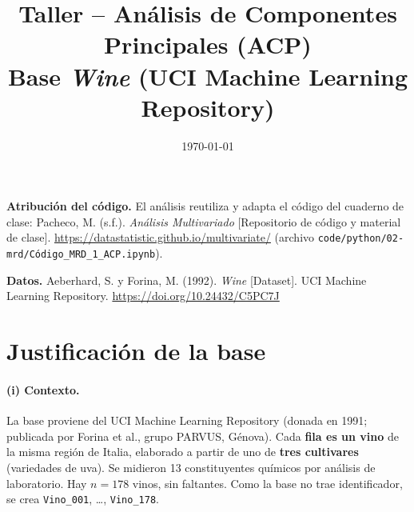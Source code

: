 \documentclass[11pt,a4paper]{article}
\title{\textbf{Taller -- Análisis de Componentes Principales (ACP)}\\[4pt]
\large Base \emph{Wine} (UCI Machine Learning Repository)}
\author{}
\date{\today}
\newcommand{\var}[1]{\texttt{#1}}
\begin{document}
\maketitle

\noindent\textbf{Atribución del código.} El análisis reutiliza y adapta el código del cuaderno de clase:
Pacheco, M. (s.f.). \emph{Análisis Multivariado} [Repositorio de código y material de clase].
\url{https://datastatistic.github.io/multivariate/} (archivo \texttt{code/python/02-mrd/Código\_MRD\_1\_ACP.ipynb}).

\noindent\textbf{Datos.} Aeberhard, S. y Forina, M. (1992). \emph{Wine} [Dataset]. UCI Machine Learning Repository.
\url{https://doi.org/10.24432/C5PC7J}

\tableofcontents
\newpage

\section*{Justificación de la base}

\paragraph{(i) Contexto.} La base proviene del UCI Machine Learning Repository (donada en 1991; publicada por Forina et al., grupo PARVUS, Génova). Cada \textbf{fila es un vino} de la misma región de Italia, elaborado a partir de uno de \textbf{tres cultivares} (variedades de uva). Se midieron 13 constituyentes químicos por análisis de laboratorio. Hay $n = 178$ vinos, sin faltantes. Como la base no trae identificador, se crea \var{Vino\_001}, \dots, \var{Vino\_178}.
\end{document}
